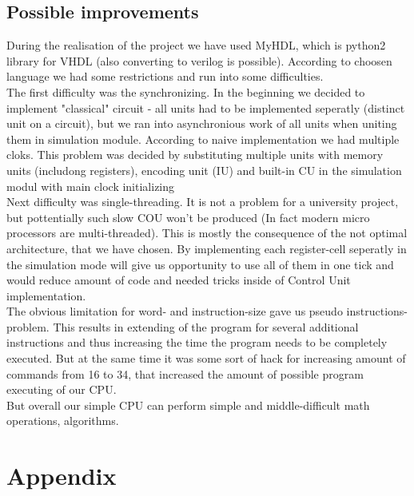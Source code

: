 \documentclass[11pt,a4paper]{article}
\begin{document}
\subsection{Possible improvements}
During the realisation of the project we have used MyHDL, which is python2 library for VHDL (also converting to verilog is possible). According to choosen language we had some restrictions and run into some difficulties.\\
The first difficulty was the synchronizing. In the beginning we decided to implement "classical" circuit - all units had to be implemented seperatly (distinct unit on a circuit), but we ran into asynchronious work of all units when uniting them in simulation module. According to naive implementation we had multiple cloks. This problem was decided by substituting multiple units with memory units (includong registers), encoding unit (IU) and built-in CU in the simulation modul with main clock initializing\\
Next difficulty was single-threading. It is not a problem for a university project, but pottentially such slow COU won't be produced (In fact modern micro processors are multi-threaded). This is mostly the consequence of the not optimal architecture, that we have chosen. By implementing each register-cell seperatly in the simulation mode will give us opportunity to use all of them in one tick and would reduce amount of code and needed tricks inside of Control Unit implementation.\\
The obvious limitation for word- and instruction-size gave us pseudo instructions-problem. This results in extending of the program for several additional instructions and thus increasing the time the program needs to be completely executed. But at the same time it was some sort of hack for increasing amount of commands from 16 to 34, that increased the amount of possible program executing of our CPU.\\
But overall our simple CPU can perform simple and middle-difficult math operations, algorithms. 

\newpage
\section*{Appendix}
\end{document}
